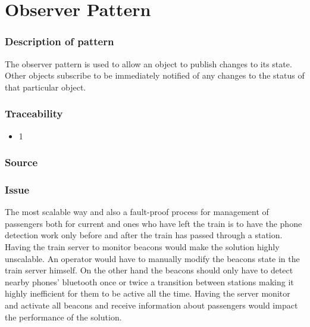 
\section{Observer Pattern}

\subsubsection{Description of pattern}

	The observer pattern is used to allow an object to publish changes to its state. Other objects subscribe to be immediately notified of any changes to the status of that particular object. 

	
\iffalse
	USAGE : The main server will observe the state of train and Activate the beacons when train leaves a station . We don't need to have the beacons active when at a station 
beacons observe when phones are in range for establishing connections
\fi

\subsubsection{Traceability} 
	\begin{itemize}
		\item 1
	\end{itemize}

\subsubsection{Source} \cite{book:design-patterns}

\subsubsection{Issue} \label{observerP:issue}
	The most scalable way and also a fault-proof process for management of passengers both for current and ones who have left the train is to have the phone detection work only before and after the train has passed through a station. Having the train server to monitor beacons would make the solution highly unscalable. An operator would have to manually modify the beacons state in the train server himself. On the other hand the beacons should only have to detect nearby phones' bluetooth once or twice a transition between stations making it highly inefficient for them to be active all the time. Having the server monitor and activate all beacons and receive information about passengers would impact the performance of the solution. 

